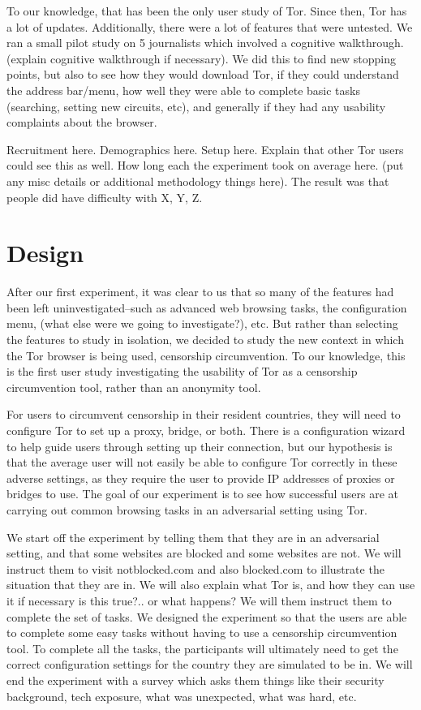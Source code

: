 \documentclass{sig-alternate-hotpets15}
\begin{document}
To our knowledge, that has been the only user study of Tor. Since then, Tor has a lot of updates. Additionally, there were a lot of features that were untested. We ran a small pilot study on 5 journalists which involved a cognitive walkthrough.(explain cognitive walkthrough if necessary). We did this to find new stopping points, but also to see how they would download Tor, if they could understand the address bar/menu, how well they were able to complete basic tasks (searching, setting new circuits, etc), and generally if they had any usability complaints about the browser. 

Recruitment here. Demographics here. Setup here. Explain that other Tor users could see this as well. How long each the experiment took on average here. (put any misc details or additional methodology things here). The result was that people did have difficulty with X, Y, Z.

\section{Design}
After our first experiment, it was clear to us that so many of the features had been left uninvestigated--such as advanced web browsing tasks, the configuration menu, (what else were we going to investigate?), etc. But rather than selecting the features to study in isolation, we decided to study the new context in which the Tor browser is being used, censorship circumvention. To our knowledge, this is the first user study investigating the usability of Tor as a censorship circumvention tool, rather than an anonymity tool. 

For users to circumvent censorship in their resident countries, they will need to configure Tor to set up a proxy, bridge, or both. There is a configuration wizard to help guide users through setting up their connection, but our hypothesis is that the average user will not easily be able to configure Tor correctly in these adverse settings, as they require the user to provide IP addresses of proxies or bridges to use. The goal of our experiment is to see how successful users are at carrying out common browsing tasks in an adversarial setting using Tor. 

We start off the experiment by telling them that they are in an adversarial setting, and that some websites are blocked and some websites are not. We will instruct them to visit notblocked.com and also blocked.com to illustrate the situation that they are in. We will also explain what Tor is, and how they can use it if necessary {\color {red} is this true?.. or what happens?} We will them instruct them to complete the set of tasks. We designed the experiment so that the users are able to complete some easy tasks without having to use a censorship circumvention tool. To complete all the tasks, the participants will ultimately need to get the correct configuration settings for the country they are simulated to be in. We will end the experiment with a survey which asks them things like their security background, tech exposure, what was unexpected, what was hard, etc.
\end{document}

